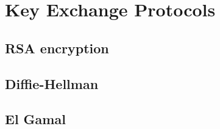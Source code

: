 \chapter{Key Exchange Protocols}

\section {RSA encryption}
\section{Diffie-Hellman}
\section{El Gamal}